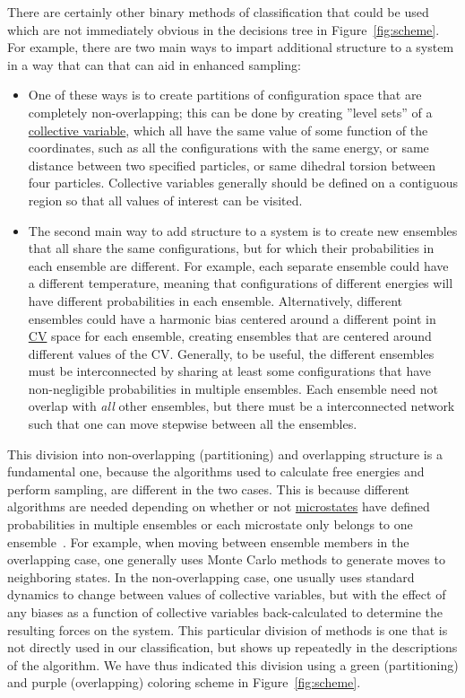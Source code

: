 \documentclass[9pt,review]{livecoms}
\begin{document}
There are certainly other binary methods of classification that could be used which are not immediately obvious in the decisions tree in Figure~\ref{fig:scheme}. For example, there are two main ways to impart additional structure to a system in a way that can that can aid in enhanced sampling: 
\begin{itemize}
\item One of these ways is to create partitions of configuration space that are completely non-overlapping; this can be done by creating ''level sets'' of a \hyperlink{ref:CV} {collective variable}, which all have the same value of some function of the coordinates, such as all the configurations with the same energy, or same distance between two specified particles, or same dihedral torsion between four particles. Collective variables generally should be defined on a contiguous region so that all values of interest can be visited. 
\item The second main way to add structure to a system is to create new ensembles that all share the same configurations, but for which their probabilities in each ensemble are different. For example, each separate ensemble could have a different temperature, meaning that configurations of different energies will have different probabilities in each ensemble. Alternatively, different ensembles could have a harmonic bias centered around a different point in \hyperlink{ref:CV} {CV} space for each ensemble, creating ensembles that are centered around different values of the CV. Generally, to be useful, the different ensembles must be interconnected by sharing at least some configurations that have non-negligible probabilities in multiple ensembles.  Each ensemble need not overlap with \emph{all} other ensembles, but there must be a interconnected network such that one can move stepwise between all the ensembles. 
\end{itemize}
This division into non-overlapping (partitioning) and overlapping structure is a fundamental one, because the algorithms used to calculate free energies and perform sampling, are different in the two cases. This is because different algorithms are needed depending on whether or not \hyperlink{ref:Microstate} {microstates} have defined probabilities in multiple ensembles or each microstate only belongs to one ensemble~\cite{Escobedo_unified_2005,abreu_framework_2006}. For example, when moving between ensemble members in the overlapping case, one generally uses Monte Carlo methods to generate moves to neighboring states. In the non-overlapping case, one usually uses standard dynamics to change between values of collective variables, but with the effect of any biases as a function of collective variables back-calculated to determine the resulting forces on the system. This particular division of methods is one that is not directly used in our classification, but shows up repeatedly in the descriptions of the algorithm. We have thus indicated this division using a green (partitioning) and purple (overlapping) coloring scheme in Figure~\ref{fig:scheme}.
\end{document}
